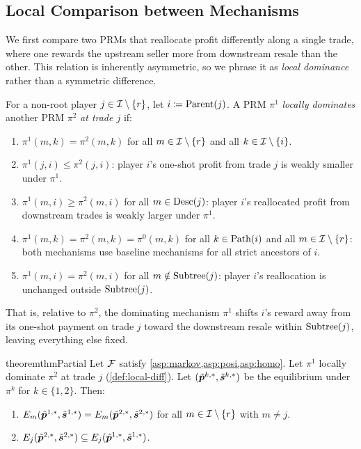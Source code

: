 \subsection{Local Comparison between Mechanisms}
\label{subsec:partial}

We first compare two PRMs that reallocate profit differently along a single trade, where one rewards the upstream seller more from downstream resale than the other. This relation is inherently asymmetric, so we phrase it as \emph{local dominance} rather than a symmetric difference.

\begin{definition}
\label{def:local-diff}
For a non-root player $j \in \mathcal{I} \setminus \{r\}$, let $i \coloneqq \operatorname{Parent}(j)$. A PRM $\pi^1$ \emph{locally dominates} another PRM $\pi^2$ \emph{at trade $j$} if:
\begin{enumerate}[label=(\alph*),left=0em]
\item $\pi^1(m, k) = \pi^2(m, k)$ for all $m \in \mathcal{I} \setminus \{r\}$ and all $k \in \mathcal{I} \setminus \{i\}$.
\item $\pi^1(j, i) \le \pi^2(j, i)$: player $i$'s one-shot profit from trade $j$ is weakly smaller under $\pi^1$.
\item $\pi^1(m, i) \ge \pi^2(m, i)$ for all $m \in \operatorname{Desc}(j)$: player $i$'s reallocated profit from downstream trades is weakly larger under $\pi^1$.
\item $\pi^1(m, k) = \pi^2(m, k) = \pi^0(m, k)$ for all $k \in \operatorname{Path}(i)$ and all $m \in \mathcal{I} \setminus \{r\}$: both mechanisms use baseline mechanisms for all strict ancestors of $i$.
\item $\pi^1(m, i) = \pi^2(m, i)$ for all $m \notin \operatorname{Subtree}(j)$: player $i$'s reallocation is unchanged outside $\operatorname{Subtree}(j)$.
\end{enumerate}
That is, relative to $\pi^2$, the dominating mechanism $\pi^1$ shifts $i$'s reward away from its one-shot payment on trade $j$ toward the downstream resale within $\operatorname{Subtree}(j)$, leaving everything else fixed.
\end{definition}

\begin{restatable}{theorem}{thmPartial}
\label{thm:partial}
Let $\mathcal{F}$ satisfy \cref{asp:markov,asp:posi,asp:homo}. Let $\pi^1$ locally dominate $\pi^2$ at trade $j$ (\cref{def:local-diff}). Let $(\tilde{{\bm{p}}}^{k,*}, \tilde{{\bm{s}}}^{k,*})$ be the equilibrium under $\pi^k$ for $k \in \{1,2\}$. Then:
\begin{enumerate}
\item $E_m(\tilde{{\bm{p}}}^{1,*}, \tilde{{\bm{s}}}^{1,*}) = E_m(\tilde{{\bm{p}}}^{2,*}, \tilde{{\bm{s}}}^{2,*})$ for all $m \in \mathcal{I} \setminus \{r\}$ with $m \neq j$.
\item $E_j(\tilde{{\bm{p}}}^{2,*}, \tilde{{\bm{s}}}^{2,*}) \subseteq E_j(\tilde{{\bm{p}}}^{1,*}, \tilde{{\bm{s}}}^{1,*})$.
\end{enumerate}
\end{restatable}

